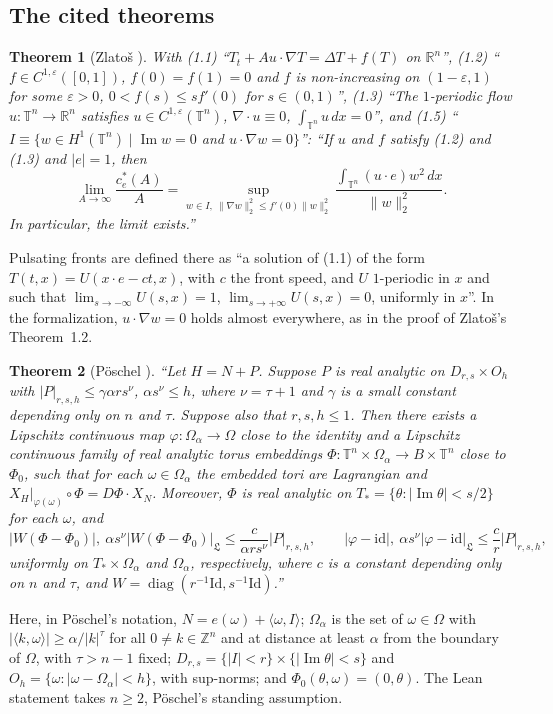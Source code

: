 \documentclass[11pt]{article}
\newtheorem{theorem}{Theorem}
\theoremstyle{definition}
\theoremstyle{remark}
\newcommand{\R}{\mathbb{R}}
\newcommand{\Z}{\mathbb{Z}}
\newcommand{\T}{\mathbb{T}}
\begin{document}
\begin{appendices}
\section{The cited theorems}\label{app:cited}
\begin{theorem}[Zlatoš {\cite[Theorem~1.1]{Z}}]\label{thm:zlatos}
With (1.1) ``$T_t+Au\cdot\nabla T=\Delta T+f(T)$ on $\R^n$'', (1.2)
``$f\in C^{1,\varepsilon}([0,1])$, $f(0)=f(1)=0$ and $f$ is non-increasing on
$(1-\varepsilon,1)$ for some $\varepsilon>0$, $0<f(s)\le sf'(0)$ for
$s\in(0,1)$'', (1.3) ``The $1$-periodic flow $u\colon\T^n\to\R^n$ satisfies
$u\in C^{1,\varepsilon}(\T^n)$, $\nabla\cdot u\equiv0$, $\int_{\T^n}u\,dx=0$'',
and (1.5) ``$I\equiv\{w\in H^1(\T^n)\mid \operatorname{Im}w=0$ and
$u\cdot\nabla w=0\}$'': ``If $u$ and $f$ satisfy (1.2) and (1.3) and
$|e|=1$, then
\[
\lim_{A\to\infty}\frac{c^*_e(A)}{A}=\sup_{w\in I,\ \|\nabla w\|_2^2\le f'(0)\|w\|_2^2}
\frac{\int_{\T^n}(u\cdot e)w^2\,dx}{\|w\|_2^2}.
\]
In particular, the limit exists.''
\end{theorem}
Pulsating fronts are defined there as ``a solution of (1.1) of the form
$T(t,x)=U(x\cdot e-ct,x)$, with $c$ the front speed, and $U$ $1$-periodic in
$x$ and such that $\lim_{s\to-\infty}U(s,x)=1$,
$\lim_{s\to+\infty}U(s,x)=0$, uniformly in $x$''. In the formalization,
$u\cdot\nabla w=0$ holds almost everywhere, as in the proof of Zlatoš's
Theorem~1.2.

\begin{theorem}[Pöschel {\cite[Theorem~A]{P}}]\label{thm:poschel}
``Let $H=N+P$. Suppose $P$ is real analytic on $D_{r,s}\times O_h$ with
$|P|_{r,s,h}\le\gamma\alpha rs^\nu$, $\alpha s^\nu\le h$, where $\nu=\tau+1$
and $\gamma$ is a small constant depending only on $n$ and $\tau$. Suppose
also that $r,s,h\le1$. Then there exists a Lipschitz continuous map
$\varphi\colon\Omega_\alpha\to\Omega$ close to the identity and a Lipschitz
continuous family of real analytic torus embeddings
$\Phi\colon\T^n\times\Omega_\alpha\to B\times\T^n$ close to $\Phi_0$, such
that for each $\omega\in\Omega_\alpha$ the embedded tori are Lagrangian and
$X_H|_{\varphi(\omega)}\circ\Phi=D\Phi\cdot X_N$. Moreover, $\Phi$ is real
analytic on $T_*=\{\theta:|\operatorname{Im}\theta|<s/2\}$ for each $\omega$,
and
\[
|W(\Phi-\Phi_0)|,\ \alpha s^\nu|W(\Phi-\Phi_0)|_{\mathfrak L}\le\frac{c}{\alpha rs^\nu}|P|_{r,s,h},\qquad
|\varphi-\mathrm{id}|,\ \alpha s^\nu|\varphi-\mathrm{id}|_{\mathfrak L}\le\frac{c}{r}|P|_{r,s,h},
\]
uniformly on $T_*\times\Omega_\alpha$ and $\Omega_\alpha$, respectively, where
$c$ is a constant depending only on $n$ and $\tau$, and
$W=\operatorname{diag}(r^{-1}\mathrm{Id},s^{-1}\mathrm{Id})$.''
\end{theorem}
Here, in Pöschel's notation, $N=e(\omega)+\langle\omega,I\rangle$;
$\Omega_\alpha$ is the set of $\omega\in\Omega$ with
$|\langle k,\omega\rangle|\ge\alpha/|k|^\tau$ for all $0\ne k\in\Z^n$ and at
distance at least $\alpha$ from the boundary of $\Omega$, with $\tau>n-1$
fixed; $D_{r,s}=\{|I|<r\}\times\{|\operatorname{Im}\theta|<s\}$ and
$O_h=\{\omega:|\omega-\Omega_\alpha|<h\}$, with sup-norms; and
$\Phi_0(\theta,\omega)=(0,\theta)$. The Lean statement takes $n\ge2$, Pöschel's
standing assumption.


\end{appendices}
\end{document}
